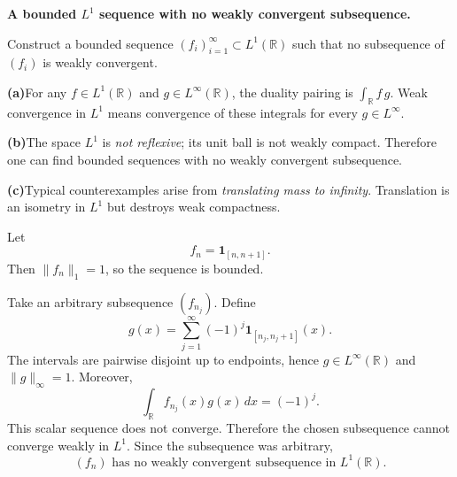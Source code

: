\begin{problem}[CP-II-0301]
\label{prob:cp-ii-0301}
\textbf{A bounded $L^1$ sequence with no weakly convergent subsequence.}

\hspace*{1.5em}Construct a bounded sequence $(f_i)_{i=1}^\infty\subset L^1(\mathbb R)$
	such that no subsequence of $(f_i)$ is weakly convergent.

		\par\smallskip\noindent\textbf{(a)}\quad For any $f\in L^1(\mathbb R)$ and $g\in L^\infty(\mathbb R)$,
		the duality pairing is $\displaystyle \int_{\mathbb R} f\,g$.
		Weak convergence in $L^1$ means convergence of these integrals
		for every $g\in L^\infty$.
		\par\smallskip\noindent\textbf{(b)}\quad The space $L^1$ is \emph{not reflexive}; its unit ball is not weakly compact.
		Therefore one can find bounded sequences with no weakly convergent subsequence.
		\par\smallskip\noindent\textbf{(c)}\quad Typical counterexamples arise from \emph{translating mass to infinity}.
		Translation is an isometry in $L^1$ but destroys weak compactness.
\end{problem}

\begin{solution}
Let
\[
f_n=\mathbf1_{[n,n+1]}.
\]
Then \(\|f_n\|_1=1\), so the sequence is bounded.

Take an arbitrary subsequence \((f_{n_j})\). Define
\[
g(x)=\sum_{j=1}^{\infty}(-1)^j\mathbf1_{[n_j,n_j+1]}(x).
\]
The intervals are pairwise disjoint up to endpoints, hence \(g\in L^\infty(\mathbb R)\)
and \(\|g\|_\infty=1\). Moreover,
\[
\int_{\mathbb R}f_{n_j}(x)g(x)\,dx=(-1)^j.
\]
This scalar sequence does not converge. Therefore the chosen subsequence cannot converge
weakly in \(L^1\). Since the subsequence was arbitrary,
\[
\boxed{(f_n)\text{ has no weakly convergent subsequence in }L^1(\mathbb R).}
\]
\end{solution}


